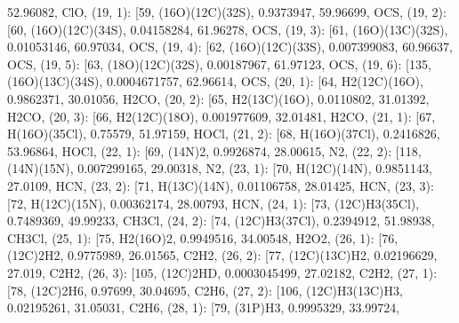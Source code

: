 \documentclass[letterpaper,10pt,english]{sphinxmanual}
\begin{document}
\begin{fulllineitems}
52.96082, \textquotesingle{}ClO\textquotesingle{}{]}, (19, 1): {[}59, \textquotesingle{}(16O)(12C)(32S)\textquotesingle{}, 0.9373947, 59.96699, \textquotesingle{}OCS\textquotesingle{}{]}, (19, 2): {[}60, \textquotesingle{}(16O)(12C)(34S)\textquotesingle{}, 0.04158284, 61.96278, \textquotesingle{}OCS\textquotesingle{}{]}, (19, 3): {[}61, \textquotesingle{}(16O)(13C)(32S)\textquotesingle{}, 0.01053146, 60.97034, \textquotesingle{}OCS\textquotesingle{}{]}, (19, 4): {[}62, \textquotesingle{}(16O)(12C)(33S)\textquotesingle{}, 0.007399083, 60.96637, \textquotesingle{}OCS\textquotesingle{}{]}, (19, 5): {[}63, \textquotesingle{}(18O)(12C)(32S)\textquotesingle{}, 0.00187967, 61.97123, \textquotesingle{}OCS\textquotesingle{}{]}, (19, 6): {[}135, \textquotesingle{}(16O)(13C)(34S)\textquotesingle{}, 0.0004671757, 62.96614, \textquotesingle{}OCS\textquotesingle{}{]}, (20, 1): {[}64, \textquotesingle{}H2(12C)(16O)\textquotesingle{}, 0.9862371, 30.01056, \textquotesingle{}H2CO\textquotesingle{}{]}, (20, 2): {[}65, \textquotesingle{}H2(13C)(16O)\textquotesingle{}, 0.0110802, 31.01392, \textquotesingle{}H2CO\textquotesingle{}{]}, (20, 3): {[}66, \textquotesingle{}H2(12C)(18O)\textquotesingle{}, 0.001977609, 32.01481, \textquotesingle{}H2CO\textquotesingle{}{]}, (21, 1): {[}67, \textquotesingle{}H(16O)(35Cl)\textquotesingle{}, 0.75579, 51.97159, \textquotesingle{}HOCl\textquotesingle{}{]}, (21, 2): {[}68, \textquotesingle{}H(16O)(37Cl)\textquotesingle{}, 0.2416826, 53.96864, \textquotesingle{}HOCl\textquotesingle{}{]}, (22, 1): {[}69, \textquotesingle{}(14N)2\textquotesingle{}, 0.9926874, 28.00615, \textquotesingle{}N2\textquotesingle{}{]}, (22, 2): {[}118, \textquotesingle{}(14N)(15N)\textquotesingle{}, 0.007299165, 29.00318, \textquotesingle{}N2\textquotesingle{}{]}, (23, 1): {[}70, \textquotesingle{}H(12C)(14N)\textquotesingle{}, 0.9851143, 27.0109, \textquotesingle{}HCN\textquotesingle{}{]}, (23, 2): {[}71, \textquotesingle{}H(13C)(14N)\textquotesingle{}, 0.01106758, 28.01425, \textquotesingle{}HCN\textquotesingle{}{]}, (23, 3): {[}72, \textquotesingle{}H(12C)(15N)\textquotesingle{}, 0.00362174, 28.00793, \textquotesingle{}HCN\textquotesingle{}{]}, (24, 1): {[}73, \textquotesingle{}(12C)H3(35Cl)\textquotesingle{}, 0.7489369, 49.99233, \textquotesingle{}CH3Cl\textquotesingle{}{]}, (24, 2): {[}74, \textquotesingle{}(12C)H3(37Cl)\textquotesingle{}, 0.2394912, 51.98938, \textquotesingle{}CH3Cl\textquotesingle{}{]}, (25, 1): {[}75, \textquotesingle{}H2(16O)2\textquotesingle{}, 0.9949516, 34.00548, \textquotesingle{}H2O2\textquotesingle{}{]}, (26, 1): {[}76, \textquotesingle{}(12C)2H2\textquotesingle{}, 0.9775989, 26.01565, \textquotesingle{}C2H2\textquotesingle{}{]}, (26, 2): {[}77, \textquotesingle{}(12C)(13C)H2\textquotesingle{}, 0.02196629, 27.019, \textquotesingle{}C2H2\textquotesingle{}{]}, (26, 3): {[}105, \textquotesingle{}(12C)2HD\textquotesingle{}, 0.0003045499, 27.02182, \textquotesingle{}C2H2\textquotesingle{}{]}, (27, 1): {[}78, \textquotesingle{}(12C)2H6\textquotesingle{}, 0.97699, 30.04695, \textquotesingle{}C2H6\textquotesingle{}{]}, (27, 2): {[}106, \textquotesingle{}(12C)H3(13C)H3\textquotesingle{}, 0.02195261, 31.05031, \textquotesingle{}C2H6\textquotesingle{}{]}, (28, 1): {[}79, \textquotesingle{}(31P)H3\textquotesingle{}, 0.9995329, 33.99724, 
\end{fulllineitems}
\end{document}
